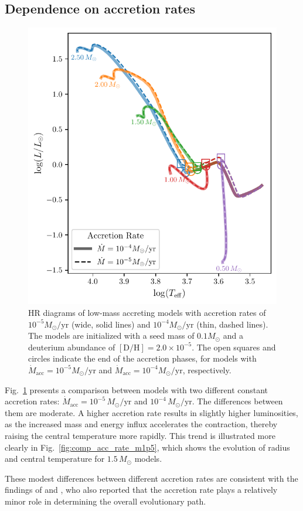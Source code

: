 \documentclass[12pt,a4paper]{article}
\newcommand{\mr}{\mathrm}
\begin{document}
\subsection{Dependence on accretion rates}
\label{sec:accretion_rate}

\begin{figure}
  \centering  
  \includegraphics[width=.49\textwidth,keepaspectratio]{cmp_accretionrate.pdf}
  \caption{HR diagrams of low-mass accreting models with accretion rates of $10^{-5} M_\odot/\mr{yr}$ (wide, solid lines) and $10^{-4} M_\odot/\mr{yr}$ (thin, dashed lines). The models are initialized with a seed mass of $0.1 M_\odot$ and a deuterium abundance of $[\mr{D/H}] = 2.0\times 10^{-5}$. The open squares and circles indicate the end of the accretion phases, for models with $\dot{M}_\mr{acc} = 10^{-5} M_\odot/\mr{yr}$ and $\dot{M}_\mr{acc} = 10^{-4} M_\odot/\mr{yr}$, respectively.} \label{fig:comp_acc_rate}
\end{figure}

Fig.~\ref{fig:comp_acc_rate} presents a comparison between models with two different constant accretion rates: $\dot{M}_\mr{acc} = 10^{-5}\,M_\odot/\mr{yr}$ and $10^{-4}\,M_\odot/\mr{yr}$. The differences between them are moderate. A higher accretion rate results in slightly higher luminosities, as the increased mass and energy influx accelerates the contraction, thereby raising the central temperature more rapidly. This trend is illustrated more clearly in Fig.~\ref{fig:comp_acc_rate_m1p5}, which shows the evolution of radius and central temperature for $1.5\,M_\odot$ models. 

These modest differences between different accretion rates are consistent with the findings of \textcite{HosokawaEtAl2011} and \textcite{KunitomoEtAl2017}, who also reported that the accretion rate plays a relatively minor role in determining the overall evolutionary path.
\end{document}
